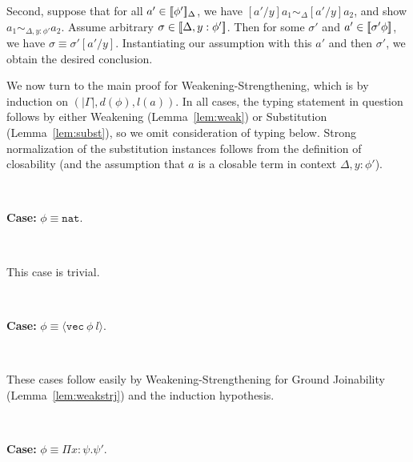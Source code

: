 \documentclass[copyright]{eptcs}
\newcommand{\vc}[0]{\texttt{vec}}
\newcommand{\nat}[0]{\texttt{nat}}
\newcommand{\interp}[1]{[\negthinspace[#1]\negthinspace]}
\begin{document}
Second, suppose that for all $a'\in\interp{\phi'}_\Delta$, we have
$[a'/y]a_1\sim_\Delta [a'/y]a_2$, and show $a_1\sim_{\Delta,y:\phi'}
a_2$.  Assume arbitrary $\sigma\in\interp{\Delta,y:\phi'}$.  Then for
some $\sigma'$ and $a'\in\interp{\sigma'\phi}$, we have
$\sigma\equiv\sigma'[a'/y]$.  Instantiating our assumption with this
$a'$ and then $\sigma'$, we obtain the desired conclusion.

We now turn to the main proof for Weakening-Strengthening, which is by
induction on $(|\Gamma|,d(\phi),l(a))$.  In all cases, the typing
statement in question follows by either Weakening
(Lemma~\ref{lem:weak}) or Substitution (Lemma~\ref{lem:subst}), so we
omit consideration of typing below.  Strong normalization of the
substitution instances follows from the definition of closability (and
the assumption that $a$ is a closable term in context $\Delta,y:\phi'$).



\

\noindent \textbf{Case:} $\phi\equiv\nat$.

\

\noindent This case is trivial.

\ 

\noindent \textbf{Case:} $\phi\equiv\langle\vc\ \phi\ l\rangle$.

\

\noindent These cases follow easily by Weakening-Strengthening for Ground
Joinability (Lemma~\ref{lem:weakstrj}) and the induction hypothesis.

\ 

\noindent \textbf{Case:} $\phi\equiv\Pi x:\psi.\psi'$.

\
\end{document}
